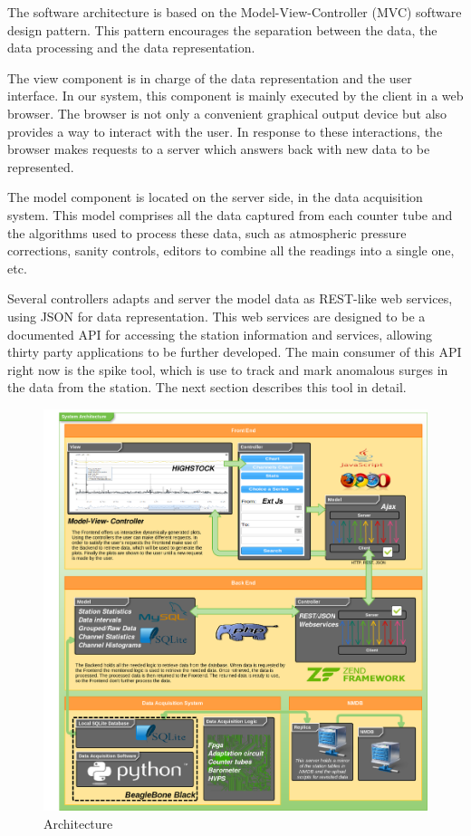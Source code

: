 \documentclass[a4paper]{jpconf}
\begin{document}
The software architecture is based on the Model-View-Controller (MVC) software
design pattern\cite{wiki:MVC}. This pattern encourages the separation between
the data, the data processing and the data representation. 

The view component is in charge of the data representation and the user
interface. In our system, this component is mainly executed by the client in a
web browser. The browser is not only a convenient graphical output device but
also provides a way to interact with the user. In response to these
interactions, the browser makes requests to a server which answers back with new
data to be represented.

The model component is located on the server side, in the data acquisition
system. This model comprises all the data captured from each counter tube and
the algorithms used to process these data, such as atmospheric pressure
corrections, sanity controls, editors to combine all the readings into a single
one, etc.

Several controllers adapts and server the model data as REST-like web services,
using JSON for data representation. This web services are designed to be a
documented API for accessing the station information and services, allowing
thirty party applications to be further developed. The main consumer of this API
right now is the spike tool, which is use to track and mark anomalous surges in
the data from the station. The next section describes this tool in detail.

\begin{figure}[h]
    \centering
    \includegraphics[keepaspectratio, width=1\textwidth]{./resources/Architecture.png}
    \caption{Architecture}
    \label{fig:arch}
\end{figure}
\end{document}
